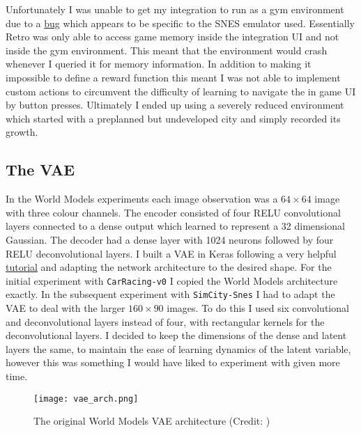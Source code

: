 \documentclass{article}
\numberwithin{figure}{section}
\theoremstyle{definition}
\begin{document}
Unfortunately I was unable to get my integration to run as a gym environment due to a \href{https://github.com/openai/retro/issues/115}{bug} which appears to be specific to the SNES emulator used.
Essentially Retro was only able to access game memory inside the integration UI and not inside the gym environment.
This meant that the environment would crash whenever I queried it for memory information.
In addition to making it impossible to define a reward function this meant I was not able to implement custom actions to circumvent the difficulty of learning to navigate the in game UI by button presses.
Ultimately I ended up using a severely reduced environment which started with a preplanned but undeveloped city and simply recorded its growth.



\subsection{The VAE}
\label{VAEsubsec}
In the World Models experiments each image observation was a $64\times 64$ image with three colour channels.
The encoder consisted of four RELU convolutional layers connected to a dense output which learned to represent a 32 dimensional Gaussian.
The decoder had a dense layer with 1024 neurons followed by four RELU deconvolutional layers.
I built a VAE in Keras \citep{chollet2015keras} following a very helpful \href{https://tiao.io/post/tutorial-on-variational-autoencoders-with-a-concise-keras-implementation/}{tutorial} and adapting the network architecture to the desired shape.
For the initial experiment with \texttt{CarRacing-v0} I copied the World Models architecture exactly.
In the subsequent experiment with \texttt{SimCity-Snes} I had to adapt the VAE to deal with the larger $160 \times 90$ images.
To do this I used six convolutional and deconvolutional layers instead of four, with rectangular kernels for the deconvolutional layers.
I decided to keep the dimensions of the dense and latent layers the same, to maintain the ease of learning dynamics of the latent variable, however this was something I would have liked to experiment with given more time.

\begin{figure}[h]
  \centering
  \texttt{[image: vae\_arch.png]}
  \caption{The original World Models VAE architecture (Credit: \cite{ha2018world})}
  \label{vaeArchFig}
\end{figure}
\end{document}
